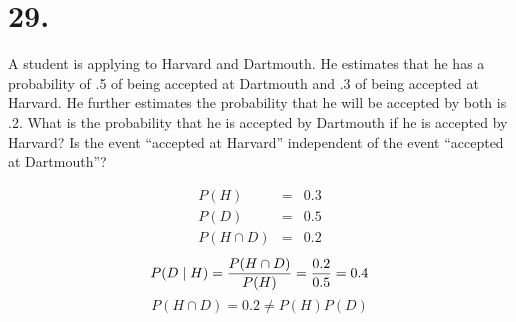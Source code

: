\section*{29.}
A student is applying to Harvard and Dartmouth. He estimates that he has
a probability of .5 of being accepted at Dartmouth and .3 of being accepted
at Harvard. He further estimates the probability that he will be accepted by
both is .2. What is the probability that he is accepted by Dartmouth if he is
accepted by Harvard? Is the event ``accepted at Harvard'' independent of the
event ``accepted at Dartmouth''?

\bigskip
\noindent
\begin{eqnarray*}
P(H)&=&0.3\\
P(D)&=&0.5\\
P(H\cap D)&=&0.2
\end{eqnarray*}
$$P(D\mid H)={P(H\cap D)\over P(H)}={0.2\over0.5}=0.4$$
$$P(H\cap D)=0.2\ne P(H)P(D)$$


